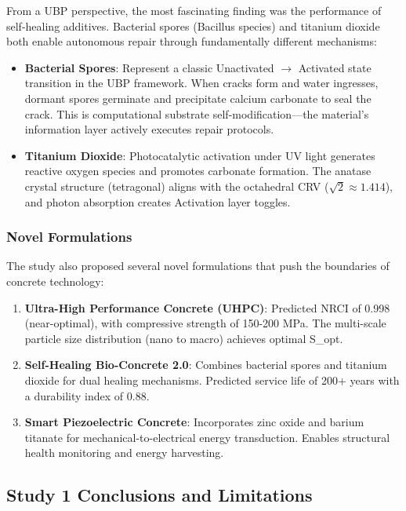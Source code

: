\documentclass[11pt,a4paper]{article}
\begin{document}
From a UBP perspective, the most fascinating finding was the performance of self-healing additives. Bacterial spores (Bacillus species) and titanium dioxide both enable autonomous repair through fundamentally different mechanisms:

\begin{itemize}
    \item \textbf{Bacterial Spores}: Represent a classic Unactivated $\rightarrow$ Activated state transition in the UBP framework. When cracks form and water ingresses, dormant spores germinate and precipitate calcium carbonate to seal the crack. This is computational substrate self-modification—the material's information layer actively executes repair protocols.
    
    \item \textbf{Titanium Dioxide}: Photocatalytic activation under UV light generates reactive oxygen species and promotes carbonate formation. The anatase crystal structure (tetragonal) aligns with the octahedral CRV ($\sqrt{2} \approx 1.414$), and photon absorption creates Activation layer toggles.
\end{itemize}

\subsubsection{Novel Formulations}

The study also proposed several novel formulations that push the boundaries of concrete technology:

\begin{enumerate}
    \item \textbf{Ultra-High Performance Concrete (UHPC)}: Predicted NRCI of 0.998 (near-optimal), with compressive strength of 150-200 MPa. The multi-scale particle size distribution (nano to macro) achieves optimal S\_opt.
    
    \item \textbf{Self-Healing Bio-Concrete 2.0}: Combines bacterial spores and titanium dioxide for dual healing mechanisms. Predicted service life of 200+ years with a durability index of 0.88.
    
    \item \textbf{Smart Piezoelectric Concrete}: Incorporates zinc oxide and barium titanate for mechanical-to-electrical energy transduction. Enables structural health monitoring and energy harvesting.
\end{enumerate}

\subsection{Study 1 Conclusions and Limitations}
\end{document}
